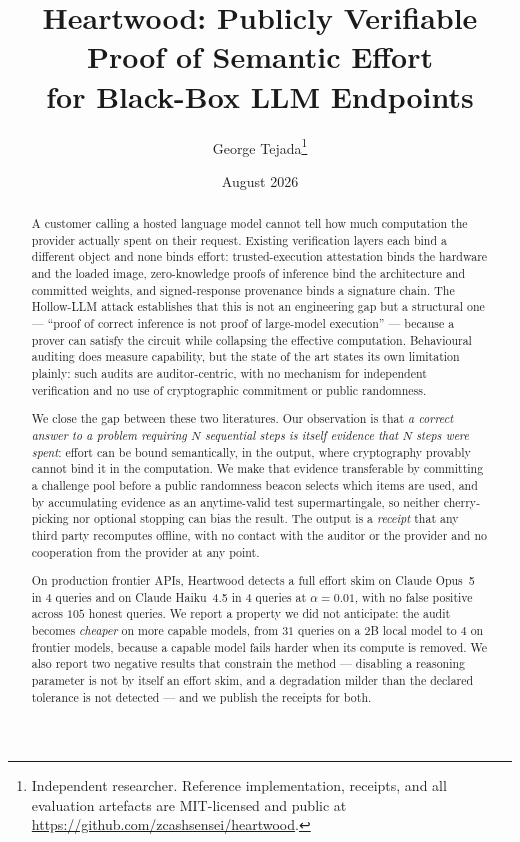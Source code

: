\documentclass[11pt]{article}
\title{Heartwood: Publicly Verifiable Proof of Semantic Effort\\
for Black-Box LLM Endpoints}
\author{George Tejada\thanks{Independent researcher. Reference implementation,
receipts, and all evaluation artefacts are MIT-licensed and public at
\url{https://github.com/zcashsensei/heartwood}.}}
\date{August 2026}
\theoremstyle{definition}
\begin{document}
\maketitle

\begin{abstract}
A customer calling a hosted language model cannot tell how much computation the
provider actually spent on their request. Existing verification layers each bind
a different object and none binds effort: trusted-execution attestation binds the
hardware and the loaded image, zero-knowledge proofs of inference bind the
architecture and committed weights, and signed-response provenance binds a
signature chain. The Hollow-LLM attack establishes that this is not an
engineering gap but a structural one --- ``proof of correct inference is not
proof of large-model execution'' --- because a prover can satisfy the circuit
while collapsing the effective computation. Behavioural auditing does measure
capability, but the state of the art states its own limitation plainly: such
audits are auditor-centric, with no mechanism for independent verification and
no use of cryptographic commitment or public randomness.

We close the gap between these two literatures. Our observation is that
\emph{a correct answer to a problem requiring $N$ sequential steps is itself
evidence that $N$ steps were spent}: effort can be bound semantically, in the
output, where cryptography provably cannot bind it in the computation. We make
that evidence transferable by committing a challenge pool before a public
randomness beacon selects which items are used, and by accumulating evidence as
an anytime-valid test supermartingale, so neither cherry-picking nor optional
stopping can bias the result. The output is a \emph{receipt} that any third
party recomputes offline, with no contact with the auditor or the provider and
no cooperation from the provider at any point.

On production frontier APIs, Heartwood detects a full effort skim on Claude
Opus~5 in $4$ queries and on Claude Haiku~4.5 in $4$ queries at
$\alpha = 0.01$, with no false positive across $105$ honest queries. We report a
property we did not anticipate: the audit becomes \emph{cheaper} on more capable
models, from $31$ queries on a 2B local model to $4$ on frontier models, because
a capable model fails harder when its compute is removed. We also report two
negative results that constrain the method --- disabling a reasoning parameter
is not by itself an effort skim, and a degradation milder than the declared
tolerance is not detected --- and we publish the receipts for both.
\end{abstract}
\end{document}
